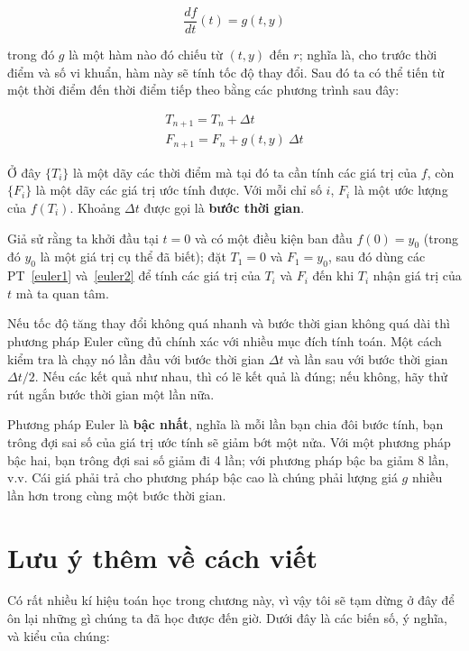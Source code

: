 \documentclass[12pt]{book}
\begin{document}
\[ \frac{df}{dt}(t) = g(t, y) \]

\noindent trong đó $g$ là một hàm nào đó chiếu từ $(t, y)$ đến $r$; nghĩa là,
cho trước thời điểm và số vi khuẩn, hàm này sẽ tính tốc độ thay đổi.
Sau đó ta có thể tiến từ một thời điểm đến thời điểm tiếp theo bằng
các phương trình sau đây:

\begin{eqnarray}
\label{euler1}
T_{n+1} = T_n + \Delta t           \\
\label{euler2}
F_{n+1} = F_n + g(t,y)~\Delta t
\end{eqnarray}

Ở đây $\{T_i\}$ là một dãy các thời điểm mà tại đó ta cần tính các
giá trị của $f$, còn $\{F_i\}$ là một dãy các giá trị ước tính được. Với
mỗi chỉ số $i$, $F_i$ là một ước lượng của $f(T_i)$. Khoảng $\Delta t$
được gọi là {\bf bước thời gian}.

Giả sử rằng ta khởi đầu tại $t=0$ và có một điều kiện ban đầu
$f(0) = y_0$ (trong đó $y_0$ là một giá trị cụ thể đã biết); đặt
$T_1 = 0$ và $F_1 = y_0$, sau đó dùng các PT~\ref{euler1} 
và~\ref{euler2} để tính các giá trị của $T_i$ và $F_i$ đến khi $T_i$
nhận giá trị của $t$ mà ta quan tâm.

Nếu tốc độ tăng thay đổi không quá nhanh và bước thời gian không 
quá dài thì phương pháp Euler cũng đủ chính xác với nhiều mục đích
tính toán. Một cách kiểm tra là chạy nó lần đầu với bước thời gian 
$\Delta t$ và lần sau với bước thời gian $\Delta t/2$. Nếu các kết quả
như nhau, thì có lẽ kết quả là đúng; nếu không, hãy thử rút ngắn
bước thời gian một lần nữa.

Phương pháp Euler là {\bf bậc nhất}, nghĩa là mỗi lần bạn chia đôi
bước tính, bạn trông đợi sai số của giá trị ước tính sẽ giảm bớt 
một nửa. Với một phương pháp bậc hai, bạn trông đợi sai số giảm
đi 4 lần; với phương pháp bậc ba giảm 8 lần, v.v. Cái giá phải trả
cho phương pháp bậc cao là chúng phải lượng giá $g$ nhiều lần hơn
trong cùng một bước thời gian.


\section{Lưu ý thêm về cách viết}

Có rất nhiều kí hiệu toán học trong chương này, vì vậy tôi sẽ tạm dừng
ở đây để ôn lại những gì chúng ta đã học được đến giờ. Dưới đây là
các biến số, ý nghĩa, và kiểu của chúng:
\end{document}

